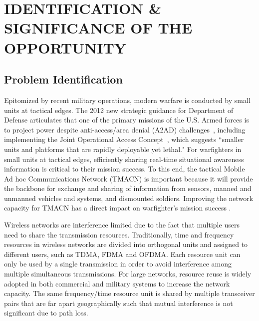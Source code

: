 \documentclass[letterpaper,11pt]{article}
\begin{document}
\section{IDENTIFICATION \& SIGNIFICANCE OF THE OPPORTUNITY}

\subsection{Problem Identification}
Epitomized by recent military operations, modern warfare is conducted by small units at tactical edges. The 2012 new strategic guidance for Department of Defense articulates that one of the primary missions of the U.S. Armed forces is to project power despite anti-access/area denial (A2AD) challenges~\cite{DoD:strategy2012}, including implementing the Joint Operational Access Concept~\cite{DoD:JOAC}, which suggests ``smaller units and platforms that are rapidly deployable yet lethal." For warfighters in small units at tactical edges, efficiently sharing real-time situational awareness information is critical to their mission success. To this end, the tactical Mobile Ad hoc Communications Network (TMACN) is important because it will provide the backbone for exchange and sharing of information from sensors, manned and unmanned vehicles and systems, and dismounted soldiers. Improving the network capacity for TMACN has a direct impact on warfighter's mission success . 


Wireless networks are interference limited due to the fact that multiple users need to share the transmission resources. Traditionally, time and frequency resources in wireless networks are divided into orthogonal units and assigned to different users, such as TDMA, FDMA and OFDMA. Each resource unit can only be used by a single transmission in order to avoid interference among multiple simultaneous transmissions. For large networks, resource reuse is widely adopted in both commercial and military systems to increase the network capacity. The same frequency/time resource unit is shared by multiple transceiver pairs that are far apart geographically such that mutual interference is not significant due to path loss. 
\end{document}
